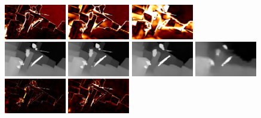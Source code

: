\documentclass[runningheads]{llncs}
\begin{document}
\begin{figure}
\begin{center}
        \includegraphics[width=0.24\textwidth,height=0.1\textwidth,clip]{figures/pred_1_err.png}
        \includegraphics[width=0.24\textwidth,height=0.1\textwidth,clip]{figures/pred_2_err.png}
        \includegraphics[width=0.24\textwidth,height=0.1\textwidth,clip]{figures/pred_3_err.png}
        \\
        \includegraphics[width=0.24\textwidth,height=0.1\textwidth,clip]{figures/pred_comb_0.png}
        \includegraphics[width=0.24\textwidth,height=0.1\textwidth,clip]{figures/pred_comb_1.png}
        \includegraphics[width=0.24\textwidth,height=0.1\textwidth,clip]{figures/pred_comb_2.png}
        \includegraphics[width=0.24\textwidth,height=0.1\textwidth,clip]{figures/pred_comb_3.png}
        \\
        \includegraphics[width=0.24\textwidth,height=0.1\textwidth,clip]{figures/pred_comb_0_err.png}
        \includegraphics[width=0.24\textwidth,height=0.1\textwidth,clip]{figures/pred_comb_1_err.png}

\end{center}
\end{figure}
\end{document}
